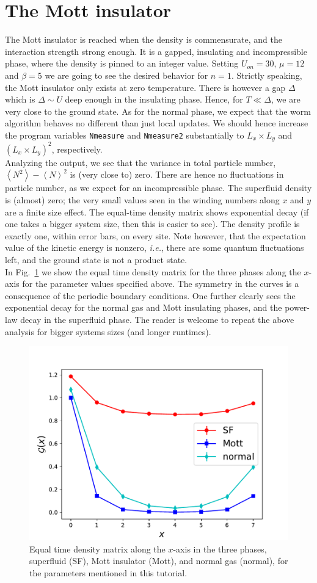 \documentclass[pra,aps,showpacs,groupedaddress,superscriptaddress,twocolumn,toc=flat]{revtex4-1}
\begin{document}
\section{The Mott insulator}
The Mott insulator is reached when the density is commensurate, and the interaction strength strong enough. It is a gapped, insulating and incompressible phase, where the density is pinned to an integer value.
Setting $U_{on} = 30$, $\mu = 12$ and $\beta = 5$ we are going to see the desired behavior for $n=1$. Strictly speaking, the Mott insulator only exists at zero temperature. There is however a gap $\Delta$ which is $ \Delta \sim U$ deep enough in the insulating phase. Hence, for $T \ll \Delta$, we are very close to the ground state.  As for the normal phase, we expect that the worm algorithm behaves no different than just local updates. We should hence increase the program variables  \texttt{Nmeasure} and  \texttt{Nmeasure2} substantially to $L_x \times L_y$ and $(L_x \times L_y)^2$, respectively. \\

Analyzing the output, we see that the variance in total particle number, $\left< N^2 \right> - \left< N \right>^2$ is (very close to) zero. There are hence no fluctuations in particle number, as we expect for an incompressible phase. The superfluid density is (almost) zero; the very small values seen in the winding numbers along $x$ and $y$ are a finite size effect.  The equal-time density matrix shows exponential decay (if one takes a bigger system size, then this is easier to see). The density profile is exactly one, within error bars, on every site. Note however, that the expectation value of the kinetic energy is nonzero, {\it i.e.}, there are some quantum fluctuations left, and the ground state is not a product state. \\


In Fig.~\ref{fig:dm} we show the equal time density matrix for the three phases along the $x$-axis for the parameter values specified above. The symmetry in the curves is a consequence of the periodic boundary conditions. One further clearly sees the exponential decay for the normal gas and Mott insulating phases, and the power-law decay in the superfluid phase. The reader is welcome to repeat the above analysis for bigger systems sizes (and longer runtimes). 


\begin{figure}[h!]
\centering
\includegraphics[width=0.6\linewidth]{fig_density_matrix.pdf}
\caption{Equal time density matrix along the $x$-axis in the three phases, superfluid (SF), Mott insulator (Mott), and normal gas (normal), for the parameters mentioned in this tutorial. } 
\label{fig:dm}
\end{figure}
\end{document}
